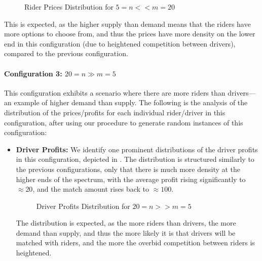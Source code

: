 \documentclass{article}
\begin{document}
\begin{enumerate}[label=(\alph*)]
\begin{itemize}
        \begin{figure}[H]
            \centering
            \resizebox{0.5\textwidth}{!}{}
            \caption{Rider Prices Distribution for $5 = n << m = 20$}
            \label{fig:q10b_n=5_m=20_rp}
        \end{figure}

        This is expected, as the higher supply than demand means that the riders have more options to choose from, and thus the prices have more density on the lower end in this configuration (due to heightened competition between drivers), compared to the previous configuration.
    \end{itemize}

    \paragraph{Configuration 3: $20 = n \gg m = 5$}
    This configuration exhibits a scenario where there are more riders than drivers---an example of higher demand than supply. The following is the analysis of the distribution of the prices/profits for each individual rider/driver in this configuration, after using our procedure to generate random instances of this configuration:

    \begin{itemize}
        \item \textbf{Driver Profits:} We identify one prominent distributions of the driver profits in this configuration, depicted in . The distribution is structured similarly to the previous configurations, only that there is much more density at the higher ends of the spectrum, with the average profit rising significantly to $\approx 20$, and the match amount rises back to $\approx 100$.
        
        \begin{figure}[H]
            \centering
            \resizebox{0.5\textwidth}{!}{}
            \caption{Driver Profits Distribution for $20 = n >> m = 5$}
            \label{fig:q10b_n=20_m=5_dp}
        \end{figure}

        The distribution is expected, as the more riders than drivers, the more demand than supply, and thus the more likely it is that drivers will be matched with riders, and the more the overbid competition between riders is heightened.


\end{itemize}
\end{enumerate}
\end{document}
